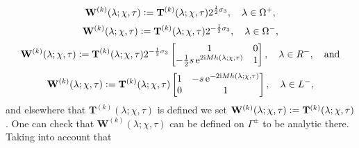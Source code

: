 \begin{equation}
\mathbf{W}^{(k)}(\lambda;\chi,\tau)\vcentcolon=\mathbf{T}^{(k)}(\lambda;\chi,\tau)2^{\frac{1}{2}\sigma_3},\quad
\lambda\in\Omega^+,
\end{equation}
\begin{equation}
\mathbf{W}^{(k)}(\lambda;\chi,\tau)\vcentcolon=\mathbf{T}^{(k)}(\lambda;\chi,\tau)2^{-\frac{1}{2}\sigma_3},\quad
\lambda\in\Omega^-,
\end{equation}
\begin{equation}
\mathbf{W}^{(k)}(\lambda;\chi,\tau)\vcentcolon=\mathbf{T}^{(k)}(\lambda;\chi,\tau)2^{-\frac{1}{2}\sigma_3}\begin{bmatrix} 1 & 0\\-\tfrac{1}{2}s\,\mathrm{e}^{2\mathrm{i} Mh(\lambda;\chi,\tau)} & 1\end{bmatrix},\quad\lambda\in R^-,\quad\text{and}
\label{eq:W-def-Schi-Stau-Rminus-ALT}
\end{equation}
\begin{equation}
\mathbf{W}^{(k)}(\lambda;\chi,\tau)\vcentcolon=\mathbf{T}^{(k)}(\lambda;\chi,\tau)\begin{bmatrix}
1 & -s\,\mathrm{e}^{-2\mathrm{i} Mh(\lambda;\chi,\tau)}\\ 0 & 1\end{bmatrix},\quad
\lambda\in L^-,
 \label{eq:W-def-Schi-Stau-Lminus-ALT}
\end{equation}
and elsewhere that $\mathbf{T}^{(k)}(\lambda;\chi,\tau)$ is defined we set $\mathbf{W}^{(k)}(\lambda;\chi,\tau)\vcentcolon=\mathbf{T}^{(k)}(\lambda;\chi,\tau)$.  One can check that $\mathbf{W}^{(k)}(\lambda;\chi,\tau)$ can be defined on $\Gamma^\pm$ to be analytic there.  Taking into account that 
